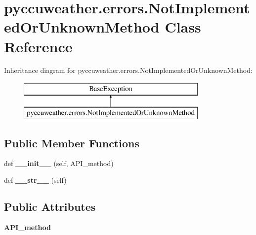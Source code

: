 \hypertarget{classpyccuweather_1_1errors_1_1_not_implemented_or_unknown_method}{}\section{pyccuweather.\+errors.\+Not\+Implemented\+Or\+Unknown\+Method Class Reference}
\label{classpyccuweather_1_1errors_1_1_not_implemented_or_unknown_method}
Inheritance diagram for pyccuweather.\+errors.\+Not\+Implemented\+Or\+Unknown\+Method\+:\begin{figure}[H]
\begin{center}
\leavevmode
\includegraphics[height=2.000000cm]{classpyccuweather_1_1errors_1_1_not_implemented_or_unknown_method}
\end{center}
\end{figure}
\subsection*{Public Member Functions}
\begin{DoxyCompactItemize}
\item 
\hypertarget{classpyccuweather_1_1errors_1_1_not_implemented_or_unknown_method_a7528d7704d9365a1b4a3a237d845cc0f}{}def {\bfseries \+\_\+\+\_\+init\+\_\+\+\_\+} (self, A\+P\+I\+\_\+method)\label{classpyccuweather_1_1errors_1_1_not_implemented_or_unknown_method_a7528d7704d9365a1b4a3a237d845cc0f}

\item 
\hypertarget{classpyccuweather_1_1errors_1_1_not_implemented_or_unknown_method_a915ece839cebfbb92f9b0ff1084ebb61}{}def {\bfseries \+\_\+\+\_\+str\+\_\+\+\_\+} (self)\label{classpyccuweather_1_1errors_1_1_not_implemented_or_unknown_method_a915ece839cebfbb92f9b0ff1084ebb61}

\end{DoxyCompactItemize}
\subsection*{Public Attributes}
\begin{DoxyCompactItemize}
\item 
\hypertarget{classpyccuweather_1_1errors_1_1_not_implemented_or_unknown_method_a3e66e277e85cb9815c13ed91da4210e9}{}{\bfseries A\+P\+I\+\_\+method}\label{classpyccuweather_1_1errors_1_1_not_implemented_or_unknown_method_a3e66e277e85cb9815c13ed91da4210e9}

\end{DoxyCompactItemize}


